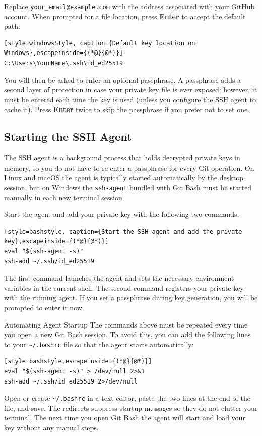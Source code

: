Replace \texttt{your\_email@example.com} with the address associated with your GitHub account. When prompted for a file location, press \textbf{Enter} to accept the default path:

\begin{lstlisting}[style=windowsStyle, caption={Default key location on Windows},escapeinside={(*@}{@*)}]
C:\Users\YourName\.ssh\id_ed25519
\end{lstlisting}

You will then be asked to enter an optional passphrase. A passphrase adds a second layer of protection in case your private key file is ever exposed; however, it must be entered each time the key is used (unless you configure the SSH agent to cache it). Press \textbf{Enter} twice to skip the passphrase if you prefer not to set one.

\subsection{Starting the SSH Agent}

The SSH agent is a background process that holds decrypted private keys in memory, so you do not have to re-enter a passphrase for every Git operation. On Linux and macOS the agent is typically started automatically by the desktop session, but on Windows the \texttt{ssh-agent} bundled with Git Bash must be started manually in each new terminal session.

Start the agent and add your private key with the following two commands:

\begin{lstlisting}[style=bashstyle, caption={Start the SSH agent and add the private key},escapeinside={(*@}{@*)}]
eval "$(ssh-agent -s)"
ssh-add ~/.ssh/id_ed25519
\end{lstlisting}

The first command launches the agent and sets the necessary environment variables in the current shell. The second command registers your private key with the running agent. If you set a passphrase during key generation, you will be prompted to enter it now.

\begin{tipbox}{Automating Agent Startup}
The commands above must be repeated every time you open a new Git Bash session. To avoid this, you can add the following lines to your \texttt{\textasciitilde/.bashrc} file so that the agent starts automatically:

\begin{lstlisting}[style=bashstyle,escapeinside={(*@}{@*)}]
eval "$(ssh-agent -s)" > /dev/null 2>&1
ssh-add ~/.ssh/id_ed25519 2>/dev/null
\end{lstlisting}

Open or create \texttt{\textasciitilde/.bashrc} in a text editor, paste the two lines at the end of the file, and save. The redirects suppress startup messages so they do not clutter your terminal. The next time you open Git Bash the agent will start and load your key without any manual steps.
\end{tipbox}

